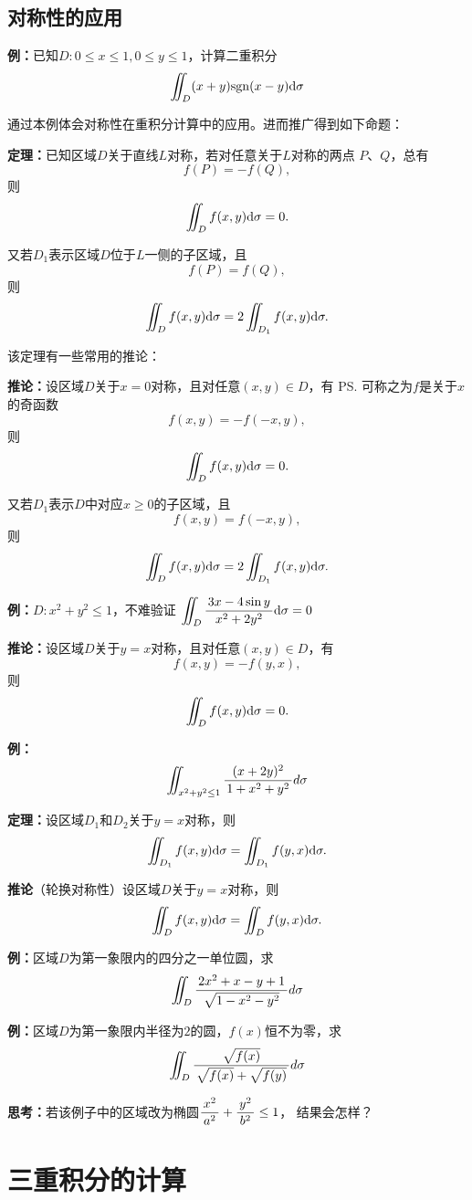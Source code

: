\subsection{对称性的应用}

{\bf 例：}已知$D:0\leq x\leq1,0\leq y\leq1$，计算二重积分
$$\iint_D(x+y)\mathrm{sgn}(x-y)\mathrm{d}\sigma$$

通过本例体会对称性在重积分计算中的应用。进而推广得到如下命题：

{\bf 定理：}已知区域$D$关于直线$L$对称，若对任意关于$L$对称的两点
$P$、$Q$，总有
$$f(P)=-f(Q),$$
则
$$\iint_Df(x,y)\mathrm{d}\sigma=0.$$

又若$D_1$表示区域$D$位于$L$一侧的子区域，且
$$f(P)=f(Q),$$
则
$$\iint_Df(x,y)\mathrm{d}\sigma=2\iint_{D_1}f(x,y)\mathrm{d}\sigma.$$

该定理有一些常用的推论：

{\bf 推论：}设区域$D$关于$x=0$对称，且对任意$(x,y)\in D$，有
\ps{可称之为$f$是关于$x$的奇函数}
$$f(x,y)=-f(-x,y),$$
则
$$\iint_Df(x,y)\mathrm{d}\sigma=0.$$

又若$D_1$表示$D$中对应$x\geq0$的子区域，且
$$f(x,y)=f(-x,y),$$
则
$$\iint_Df(x,y)\mathrm{d}\sigma=2\iint_{D_1}f(x,y)\mathrm{d}\sigma.$$

{\bf 例：}$D:x^2+y^2\leq 1$，不难验证
$\displaystyle\iint_D\displaystyle\frac{\,{3x-4\sin y}\,}{\,{x^2+2y^2}\,}\mathrm{d}\sigma=0$

{\bf 推论：}设区域$D$关于$y=x$对称，且对任意$(x,y)\in D$，有
$$f(x,y)=-f(y,x),$$
则
$$\iint_Df(x,y)\mathrm{d}\sigma=0.$$

{\bf 例：}$$\iint_{x^2+y^2\leq 1}\displaystyle\frac{\,{(x+2y)^2}\,}{\,{1+x^2+y^2}\,}d\sigma$$

{\bf 定理：}设区域$D_1$和$D_2$关于$y=x$对称，则
$$\iint_{D_1}f(x,y)\mathrm{d}\sigma=\iint_{D_1}f(y,x)\mathrm{d}\sigma.$$

{\bf 推论}（轮换对称性）设区域$D$关于$y=x$对称，则
$$\iint_Df(x,y)\mathrm{d}\sigma=\iint_Df(y,x)\mathrm{d}\sigma.$$

{\bf 例：}区域$D$为第一象限内的四分之一单位圆，求
$$\iint_D\displaystyle\frac{\,{2x^2+x-y+1}\,}{\,{\sqrt{1-x^2-y^2}}\,}d\sigma$$


{\bf 例：}区域$D$为第一象限内半径为$2$的圆，$f(x)$恒不为零，求
$$\iint_D\displaystyle\frac{\,{\sqrt{f(x)}}\,}{\,{\sqrt{f(x)}+\sqrt{f(y)}}\,}d\sigma$$

{\bf 思考：}若该例子中的区域改为椭圆$\displaystyle\frac{\,{x^2}\,}{\,{a^2}\,}+\displaystyle\frac{\,{y^2}\,}{\,{b^2}\,}\leq 1$，
结果会怎样？

\section{三重积分的计算}

